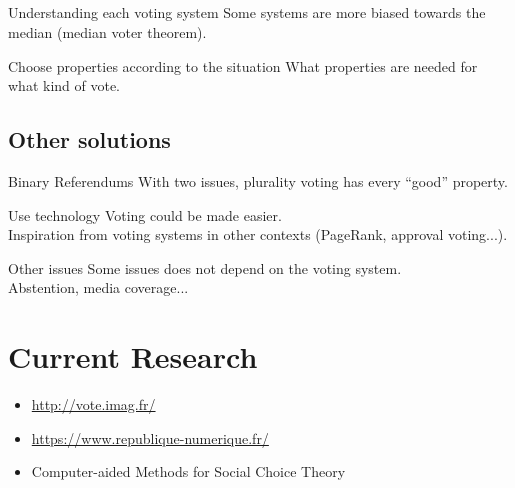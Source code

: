 \documentclass[utf8]{earlywinter}
\begin{document}
\subsection{ }
\begin{frame}{\secname}

  \begin{exampleblock}{Understanding each voting system}
    Some systems are more biased towards the median (median voter theorem).
  \end{exampleblock}
  \vfill
  \begin{exampleblock}{Choose properties according to the situation}
    What properties are needed for what kind of vote.
  \end{exampleblock}

\end{frame}

\subsection{Other solutions}
\begin{frame}{\subsecname}

  \begin{exampleblock}{Binary Referendums}
    With two issues, plurality voting has every ``good'' property.
  \end{exampleblock}
  \vfill
  \begin{exampleblock}{Use technology}
    Voting could be made easier.\\
    Inspiration from voting systems in other contexts (PageRank, approval voting...).
  \end{exampleblock}
  \vfill
  \begin{alertblock}{Other issues}
    Some issues does not depend on the voting system.\\
    Abstention, media coverage...
  \end{alertblock}

\end{frame}


\section{Current Research}
\begin{frame}{\secname}

  \begin{itemize}
  \item \url{http://vote.imag.fr/}
  \item \url{https://www.republique-numerique.fr/}
  \item Computer-aided Methods for Social Choice Theory
  \end{itemize}
\end{frame}
\end{document}
